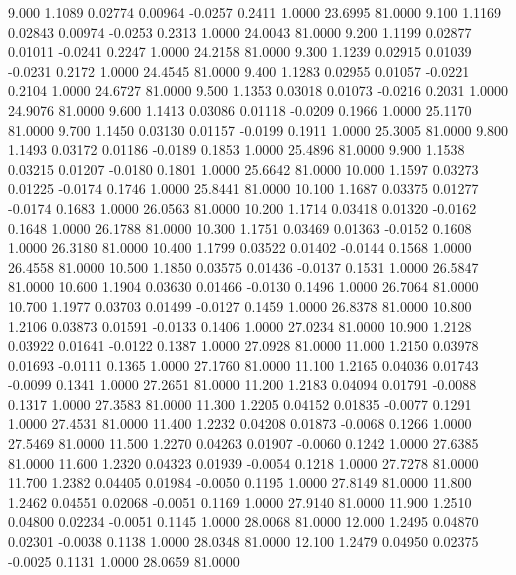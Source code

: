    9.000   1.1089   0.02774   0.00964  -0.0257   0.2411   1.0000  23.6995  81.0000
   9.100   1.1169   0.02843   0.00974  -0.0253   0.2313   1.0000  24.0043  81.0000
   9.200   1.1199   0.02877   0.01011  -0.0241   0.2247   1.0000  24.2158  81.0000
   9.300   1.1239   0.02915   0.01039  -0.0231   0.2172   1.0000  24.4545  81.0000
   9.400   1.1283   0.02955   0.01057  -0.0221   0.2104   1.0000  24.6727  81.0000
   9.500   1.1353   0.03018   0.01073  -0.0216   0.2031   1.0000  24.9076  81.0000
   9.600   1.1413   0.03086   0.01118  -0.0209   0.1966   1.0000  25.1170  81.0000
   9.700   1.1450   0.03130   0.01157  -0.0199   0.1911   1.0000  25.3005  81.0000
   9.800   1.1493   0.03172   0.01186  -0.0189   0.1853   1.0000  25.4896  81.0000
   9.900   1.1538   0.03215   0.01207  -0.0180   0.1801   1.0000  25.6642  81.0000
  10.000   1.1597   0.03273   0.01225  -0.0174   0.1746   1.0000  25.8441  81.0000
  10.100   1.1687   0.03375   0.01277  -0.0174   0.1683   1.0000  26.0563  81.0000
  10.200   1.1714   0.03418   0.01320  -0.0162   0.1648   1.0000  26.1788  81.0000
  10.300   1.1751   0.03469   0.01363  -0.0152   0.1608   1.0000  26.3180  81.0000
  10.400   1.1799   0.03522   0.01402  -0.0144   0.1568   1.0000  26.4558  81.0000
  10.500   1.1850   0.03575   0.01436  -0.0137   0.1531   1.0000  26.5847  81.0000
  10.600   1.1904   0.03630   0.01466  -0.0130   0.1496   1.0000  26.7064  81.0000
  10.700   1.1977   0.03703   0.01499  -0.0127   0.1459   1.0000  26.8378  81.0000
  10.800   1.2106   0.03873   0.01591  -0.0133   0.1406   1.0000  27.0234  81.0000
  10.900   1.2128   0.03922   0.01641  -0.0122   0.1387   1.0000  27.0928  81.0000
  11.000   1.2150   0.03978   0.01693  -0.0111   0.1365   1.0000  27.1760  81.0000
  11.100   1.2165   0.04036   0.01743  -0.0099   0.1341   1.0000  27.2651  81.0000
  11.200   1.2183   0.04094   0.01791  -0.0088   0.1317   1.0000  27.3583  81.0000
  11.300   1.2205   0.04152   0.01835  -0.0077   0.1291   1.0000  27.4531  81.0000
  11.400   1.2232   0.04208   0.01873  -0.0068   0.1266   1.0000  27.5469  81.0000
  11.500   1.2270   0.04263   0.01907  -0.0060   0.1242   1.0000  27.6385  81.0000
  11.600   1.2320   0.04323   0.01939  -0.0054   0.1218   1.0000  27.7278  81.0000
  11.700   1.2382   0.04405   0.01984  -0.0050   0.1195   1.0000  27.8149  81.0000
  11.800   1.2462   0.04551   0.02068  -0.0051   0.1169   1.0000  27.9140  81.0000
  11.900   1.2510   0.04800   0.02234  -0.0051   0.1145   1.0000  28.0068  81.0000
  12.000   1.2495   0.04870   0.02301  -0.0038   0.1138   1.0000  28.0348  81.0000
  12.100   1.2479   0.04950   0.02375  -0.0025   0.1131   1.0000  28.0659  81.0000
